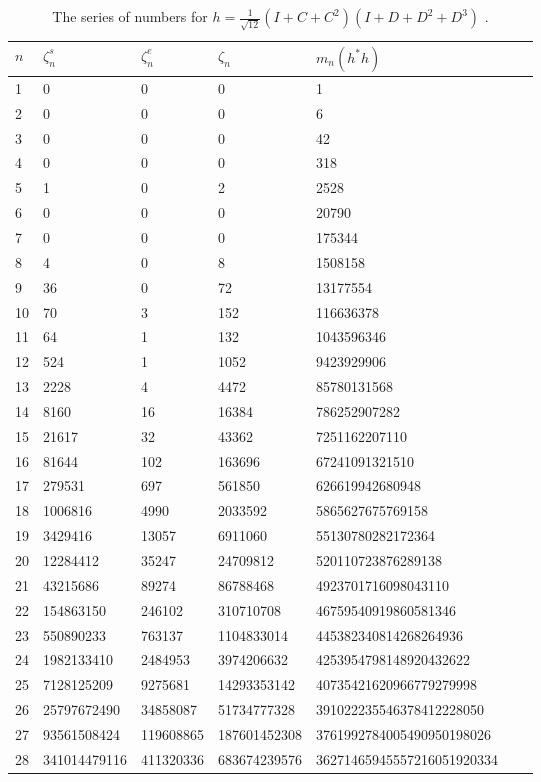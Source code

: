 \documentclass{amsart}
\theoremstyle{definition}
\begin{document}
\begin{table}[b]
\begin{tabular}{lllllll}
\hline
$n$ & $\zeta_n^s$ & $\zeta_n^e$ & $\zeta_n$ & $m_n(h^*h)$\\
\hline
1 & 0 & 0 & 0 & 1\\
2 & 0 & 0 & 0 & 6\\
3 & 0 & 0 & 0 & 42\\
4 & 0 & 0 & 0 & 318\\
5 & 1 & 0 & 2 & 2528\\
6 & 0 & 0 & 0 & 20790\\
7 & 0 & 0 & 0 & 175344\\
8 & 4 & 0 & 8 & 1508158\\
9 & 36 & 0 & 72 & 13177554\\
10 & 70 & 3 & 152 & 116636378\\
11 & 64 & 1 & 132 & 1043596346\\
12 & 524 & 1 & 1052 & 9423929906\\
13 & 2228 & 4 & 4472 & 85780131568\\
14 & 8160 & 16 & 16384 & 786252907282\\
15 & 21617 & 32 & 43362 & 7251162207110\\
16 & 81644 & 102 & 163696 & 67241091321510\\
17 & 279531 & 697 & 561850 & 626619942680948\\
18 & 1006816 & 4990 & 2033592 & 5865627675769158\\
19 & 3429416 & 13057 & 6911060 & 55130780282172364\\
20 & 12284412 & 35247 & 24709812 & 520110723876289138\\
21 & 43215686 & 89274 & 86788468 & 4923701716098043110\\
22 & 154863150 & 246102 & 310710708 & 46759540919860581346\\
23 & 550890233 & 763137 & 1104833014 & 445382340814268264936\\
24 & 1982133410 & 2484953 & 3974206632 & 4253954798148920432622\\
25 & 7128125209 & 9275681 & 14293353142 & 40735421620966779279998\\
26 & 25797672490 & 34858087 & 51734777328 & 391022235546378412228050\\
27 & 93561508424& 119608865&  187601452308  &  3761992784005490950198026\\
28 & 341014479116&411320336 &  683674239576  &  36271465945557216051920334\\
\hline
\end{tabular}
\caption{ The series of numbers for $h=\frac1{\sqrt{12}}(I+C+C^2)(I+D+D^2+D^3)$ .}
\label{t:SeriesOfNumbers}
\end{table}
\end{document}
